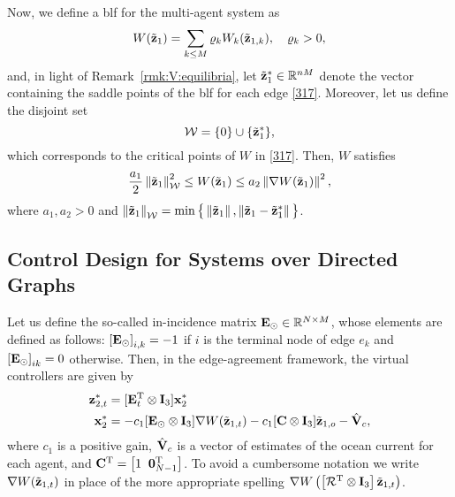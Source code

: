 Now, we define a \gls{blf} for the multi-agent system as
\begin{equation}\label{512}
W(\tilde{\mathbf{z}}_{1})=\sum_{k\leq M} \varrho_k W_k(\tilde{\mathbf{z}}_{1, k}), \quad \varrho_k>0,
\end{equation}
and, in light of Remark~\ref{rmk:V:equilibria}, let $\tilde{\mathbf{z}}_1^*\in\mathbb{R}^{nM}$ denote the vector containing the saddle points of the \gls{blf} for each edge \eqref{317}.
Moreover, let us define the disjoint set
\begin{equation}\label{517}
\mathcal{W}=\{0\}\cup\{\tilde{\mathbf{z}}_1^*\},
\end{equation}
which corresponds to the critical points of $W$ in \eqref{317}.
Then, $W$ satisfies
\begin{equation}\label{eq:BLF-bounds}
\frac{a_1}{2}\left\|\tilde{\mathbf{z}}_{1}\right\|_{\mathcal{W}}^2 \leq W(\tilde{\mathbf{z}}_{1}) \leq a_2\left\|\nabla W(\tilde{\mathbf{z}}_{1})\right\|^2,
\end{equation}
where $a_{1}, a_2 > 0$ and $\left\|\tilde{\mathbf{z}}_{1}\right\|_{\mathcal{W}} = \min \big\{\left\|\tilde{\mathbf{z}}_{1}\right\|, \left\|\tilde{\mathbf{z}}_{1} - \tilde{\mathbf{z}}_{1}^*\right\|\big\}$.

\subsection{Control Design for Systems over Directed Graphs}

Let us define the so-called in-incidence matrix $\mathbf{E}_\odot \in \mathbb{R}^{N\times M}$, whose elements are defined as follows: $\left[\mathbf{E}_\odot\right]_{i, k} = -1$ if $i$ is the terminal node of edge $e_k$ and $\left[\mathbf{E}_\odot\right]_{ik} = 0$ otherwise. Then, in the edge-agreement framework, the virtual controllers are given by
\begin{equation}\label{n284}\begin{aligned}[b]
\mathbf{z}_{2, t}^*&=[\mathbf{E}_t^{\mathrm{T}} \otimes \mathbf{I}_3] \mathbf{x}_2^*\\
\mathbf{x}_2^*&=-c_1[\mathbf{E}_\odot\otimes \mathbf{I}_3] \nabla W(\tilde{\mathbf{z}}_{1, t})-c_1[\mathbf{C}\otimes \mathbf{I}_3]\tilde{\mathbf{z}}_{1, o} - \hat{\mathbf{V}}_c,
\end{aligned}\end{equation}
where $c_1$ is a positive gain, $\hat{\mathbf{V}}_c$ is a vector of estimates of the ocean current for each agent, and $\mathbf{C}^{\mathrm{T}}=\left[1\;\;\mathbf{0}_{N-1}^{\mathrm{T}}\right]$.
To avoid a cumbersome notation we write $\nabla W(\tilde{\mathbf{z}}_{1, t})$ in place of the more appropriate spelling $\nabla W\left(\left[\mathcal{R}^{\mathrm{T}}\otimes \mathbf{I}_3\right]\tilde{\mathbf{z}}_{1, t}\right)$.

